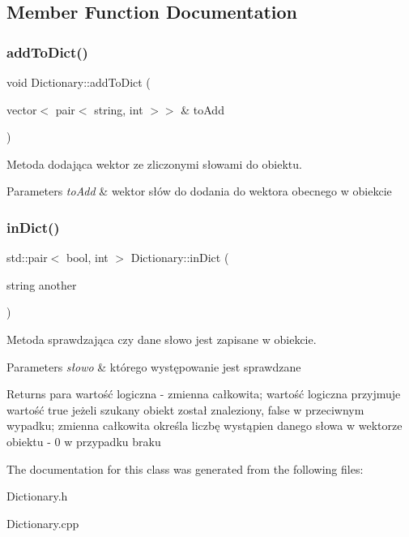 \subsection{Member Function Documentation}
\mbox{\label{class_dictionary_acfff484035a16775df9621b012d3f8cd}} 
\subsubsection{\texorpdfstring{addToDict()}{addToDict()}}
{\footnotesize\ttfamily void Dictionary\+::add\+To\+Dict (\begin{DoxyParamCaption}\item[{vector$<$ pair$<$ string, int $>$$>$ \&}]{to\+Add }\end{DoxyParamCaption})}



Metoda dodająca wektor ze zliczonymi słowami do obiektu. 


\begin{DoxyParams}{Parameters}
{\em to\+Add} & wektor słów do dodania do wektora obecnego w obiekcie \\
\hline
\end{DoxyParams}
\mbox{\label{class_dictionary_ae20890658661737cc9c5e359384489a6}} 
\subsubsection{\texorpdfstring{inDict()}{inDict()}}
{\footnotesize\ttfamily std\+::pair$<$ bool, int $>$ Dictionary\+::in\+Dict (\begin{DoxyParamCaption}\item[{string}]{another }\end{DoxyParamCaption})}



Metoda sprawdzająca czy dane słowo jest zapisane w obiekcie. 


\begin{DoxyParams}{Parameters}
{\em słowo} & którego występowanie jest sprawdzane \\
\hline
\end{DoxyParams}
\begin{DoxyReturn}{Returns}
para wartość logiczna -\/ zmienna całkowita; wartość logiczna przyjmuje wartość true jeżeli szukany obiekt został znaleziony, false w przeciwnym wypadku; zmienna całkowita określa liczbę wystąpien danego słowa w wektorze obiektu -\/ 0 w przypadku braku 
\end{DoxyReturn}


The documentation for this class was generated from the following files\+:\begin{DoxyCompactItemize}
\item 
Dictionary.\+h\item 
Dictionary.\+cpp\end{DoxyCompactItemize}
